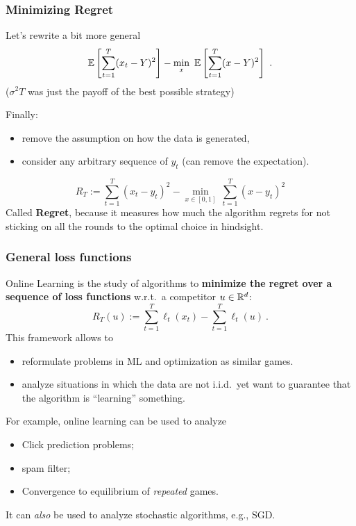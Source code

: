 \documentclass{beamer}
\begin{document}
\begin{frame}
  \frametitle{Minimizing Regret}
  Let's rewrite a bit more general
  \[
    \mathbb{E}\left[\sum_{t=1}^T (x_t - Y)^2\right] - \min_{ x } \ \mathbb{E}\left[\sum_{t=1}^T (x-Y)^2\right]~.
  \]
  ($\sigma^2T$ was just the payoff of the best possible strategy)

  Finally:
  \begin{itemize}
    \item remove the assumption on how the data is generated,
    \item consider any arbitrary sequence of $y_t$
   (can remove the expectation).
  \end{itemize}

  \[
    R_T:=\sum_{t=1}^T (x_t - y_t)^2 - \min_{x \in [0,1]} \ \sum_{t=1}^T (x - y_t)^2
  \]
  Called \textbf{Regret}, because it measures how much the algorithm regrets for not sticking on all the rounds to the optimal choice in hindsight.
\end{frame}


\begin{frame}
  \frametitle{General loss functions}
  Online Learning is the study of algorithms to \textbf{minimize the regret over a sequence of loss functions} w.r.t.\ a competitor $u \in \mathbb{R}^d$:
  \[
    R_T(u):=\sum_{t=1}^T \ell_t(x_t) - \sum_{t=1}^T \ell_t(u)~.
  \]
  This framework allows to
  \begin{itemize}
    \item reformulate problems in ML and optimization as similar games.
    \item analyze situations in which the data are not i.i.d.\ yet want to guarantee that the algorithm is ``learning'' something.
  \end{itemize}

  For example, online learning can be used to analyze
  \begin{itemize}
    \item Click prediction problems;
    \item spam filter;
    \item Convergence to equilibrium of \textit{repeated} games.
  \end{itemize}
  It can \emph{also} be used to analyze stochastic algorithms, e.g., SGD.
\end{frame}
\end{document}
